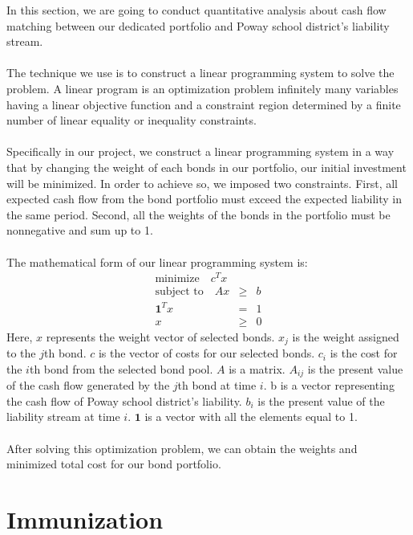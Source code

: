 \documentclass[oneside,12pt]{report}
\begin{document}
{In this section, we are going to conduct quantitative analysis about cash flow matching between our dedicated portfolio and Poway school district's liability stream.\\
\\
The technique we use is to construct a linear programming system to solve the problem. A linear program is an optimization problem infinitely many
variables having a linear objective function and a constraint region determined by a finite number of linear equality or
inequality constraints.\\
\\
Specifically in our project, we construct a linear programming system in a way that by changing the weight of each bonds in our portfolio, our initial investment will be minimized. In order to achieve so, we imposed two constraints. First, all expected cash flow from the bond portfolio must exceed the expected liability in the same period. Second, all the weights of the bonds in the portfolio must be nonnegative and sum up to 1.\\
\\
\noindent The mathematical form of our linear programming system is:
\begin{eqnarray*}
\textrm{minimize}\quad    c^T x &   &    \\
\textrm{subject to}\quad  Ax    & \geq& b   \\
                         \mathbf{1}^T x & = & 1\\
                     x     & \geq &0
\end{eqnarray*}
Here, $x$ represents the weight vector of selected bonds. $x_j$ is the weight assigned to the $j$th bond. $c$ is the vector of costs for our selected bonds. $c_i$ is the cost for the $i$th bond from the selected bond pool. $A$ is a matrix. $A_{ij}$ is the present value of the cash flow generated by the $j$th bond at time $i$. b is a vector representing the cash flow of Poway school district's liability. $b_i$ is the present value of the liability stream at time $i$. $\mathbf{1}$ is a vector with all the elements equal to 1. \\
\\
After solving this optimization problem, we can obtain the weights and minimized total cost for our bond portfolio. 
\section{Immunization}

}
\end{document}
